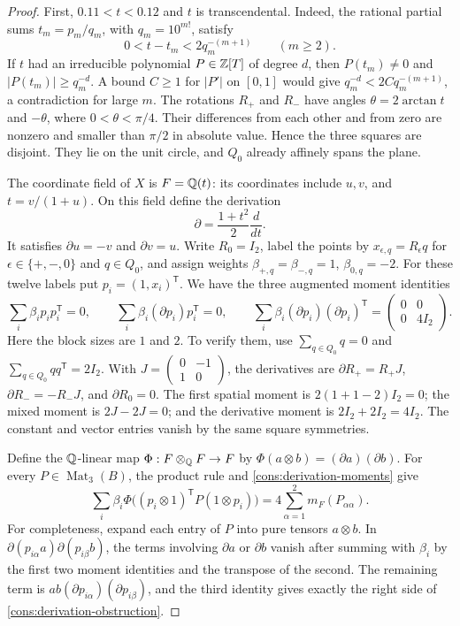 \begin{proof}
First, $0.11<t<0.12$ and $t$ is transcendental. Indeed, the rational
partial sums $t_m=p_m/q_m$, with $q_m=10^{m!}$, satisfy
\[
 0<t-t_m<2q_m^{-(m+1)}\qquad(m\ge2).
\]
If $t$ had an irreducible polynomial $P\in\mathbb Z[T]$ of degree $d$, then
$P(t_m)\ne0$ and $|P(t_m)|\ge q_m^{-d}$. A bound $C\ge1$ for
$|P'|$ on $[0,1]$ would give
$q_m^{-d}<2Cq_m^{-(m+1)}$, a contradiction for large $m$.
The rotations $R_+$ and $R_-$ have angles $\theta=2\arctan t$ and
$-\theta$, where $0<\theta<\pi/4$. Their differences from each other
and from zero are nonzero and smaller than $\pi/2$ in absolute value.
Hence the three squares are disjoint. They lie on the unit circle,
and $Q_0$ already affinely spans the plane.

The coordinate field of $X$ is $F=\mathbb Q(t)$: its coordinates include
$u,v$, and $t=v/(1+u)$. On this field define the derivation
\[
 \partial=\frac{1+t^2}{2}\frac{d}{dt}.
\]
It satisfies $\partial u=-v$ and $\partial v=u$.
Write $R_0=I_2$, label the points by $x_{\epsilon,q}=R_\epsilon q$
for $\epsilon\in\{+,-,0\}$ and $q\in Q_0$, and assign weights
$\beta_{+,q}=\beta_{-,q}=1$, $\beta_{0,q}=-2$.
For these twelve labels put $p_i=(1,x_i)^{\mathsf T}$.
We have the three augmented moment identities
\begin{equation}\label{cons:derivation-moments}
 \sum_i\beta_i p_ip_i^{\mathsf T}=0,\qquad
 \sum_i\beta_i(\partial p_i)p_i^{\mathsf T}=0,\qquad
 \sum_i\beta_i(\partial p_i)(\partial p_i)^{\mathsf T}
       =\begin{pmatrix}0&0\\0&4I_2\end{pmatrix}.
\end{equation}
Here the block sizes are $1$ and $2$. To verify them, use
$\sum_{q\in Q_0}q=0$ and $\sum_{q\in Q_0}qq^{\mathsf T}=2I_2$.
With $J=\left(\begin{smallmatrix}0&-1\\1&0\end{smallmatrix}\right)$,
the derivatives are
$\partial R_+=R_+J$, $\partial R_-=-R_-J$, and
$\partial R_0=0$. The first spatial moment is
$2(1+1-2)I_2=0$; the mixed moment is $2J-2J=0$;
and the derivative moment is $2I_2+2I_2=4I_2$.
The constant and vector entries vanish by the same square symmetries.

Define the $\mathbb Q$-linear map $\Phi:F\otimes_\mathbb Q F\to F$ by
$\Phi(a\otimes b)=(\partial a)(\partial b)$.
For every $P\in\operatorname{Mat}_3(B)$, the product rule and
\eqref{cons:derivation-moments} give
\begin{equation}\label{cons:derivation-obstruction}
 \sum_i\beta_i\Phi\bigl((p_i\otimes1)^{\mathsf T}
                         P(1\otimes p_i)\bigr)
       =4\sum_{\alpha=1}^2 m_F(P_{\alpha\alpha}).
\end{equation}
For completeness, expand each entry of $P$ into pure tensors
$a\otimes b$. In
$\partial(p_{i\alpha}a)\partial(p_{i\beta}b)$, the terms involving
$\partial a$ or $\partial b$ vanish after summing with $\beta_i$ by
the first two moment identities and the transpose of the second.
The remaining term is $ab(\partial p_{i\alpha})
(\partial p_{i\beta})$, and the third identity gives exactly the
right side of \eqref{cons:derivation-obstruction}.


\end{proof}
